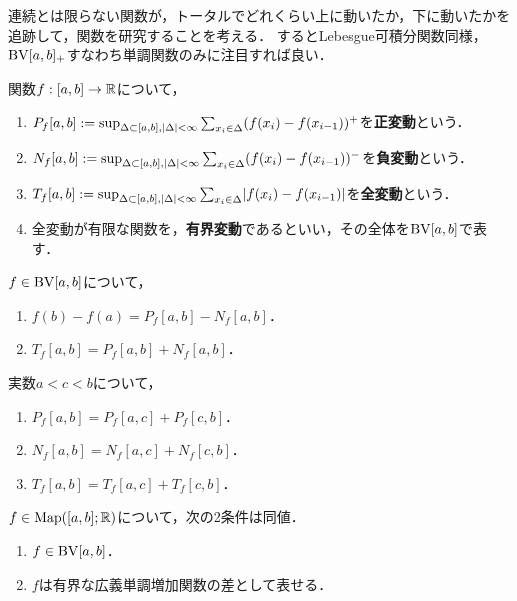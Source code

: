 \documentclass[uplatex, dvipdfmx]{jsreport}
\begin{document}
\begin{tcolorbox}[colframe=ForestGreen, colback=ForestGreen!10!white,breakable,colbacktitle=ForestGreen!40!white,coltitle=black,fonttitle=\bfseries\sffamily,
title=]
    連続とは限らない関数が，トータルでどれくらい上に動いたか，下に動いたかを追跡して，関数を研究することを考える．
    するとLebesgue可積分関数同様，$\mathrm{BV}[a,b]_+$すなわち単調関数のみに注目すれば良い．
\end{tcolorbox}

\begin{definition}
    関数$f:[a,b]\to\mathbb{R}$について，
    \begin{enumerate}
        \item $P_f[a,b]:=\sup_{\Delta\subset[a,b],\lvert\Delta\rvert<\infty}\sum_{x_i\in\Delta}(f(x_i)-f(x_{i-1}))^+$を\textbf{正変動}という．
        \item $N_f[a,b]:=\sup_{\Delta\subset[a,b],\lvert\Delta\rvert<\infty}\sum_{x_i\in\Delta}(f(x_i)-f(x_{i-1}))^-$を\textbf{負変動}という．
        \item $T_f[a,b]:=\sup_{\Delta\subset[a,b],\lvert\Delta\rvert<\infty}\sum_{x_i\in\Delta}\lvert f(x_i)-f(x_{i-1})\rvert$を\textbf{全変動}という．
        \item 全変動が有限な関数を，\textbf{有界変動}であるといい，その全体を$\mathrm{BV}[a,b]$で表す．
    \end{enumerate}
\end{definition}

\begin{proposition}
    $f\in\mathrm{BV}[a,b]$について，
    \begin{enumerate}
        \item $f(b)-f(a)=P_f[a,b]-N_f[a,b]$．
        \item $T_f[a,b]=P_f[a,b]+N_f[a,b]$．
    \end{enumerate}
\end{proposition}

\begin{proposition}
    実数$a<c<b$について，
    \begin{enumerate}
        \item $P_f[a,b]=P_f[a,c]+P_f[c,b]$．
        \item $N_f[a,b]=N_f[a,c]+N_f[c,b]$．
        \item $T_f[a,b]=T_f[a,c]+T_f[c,b]$．
    \end{enumerate}
\end{proposition}

\begin{corollary}[有界変動関数の特徴付け]
    $f\in\mathrm{Map}([a,b];\mathbb{R})$について，次の2条件は同値．
    \begin{enumerate}
        \item $f\in\mathrm{BV}[a,b]$．
        \item $f$は有界な広義単調増加関数の差として表せる．
    \end{enumerate}
\end{corollary}
\end{document}
